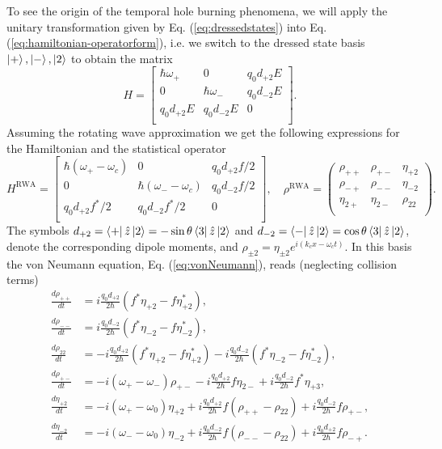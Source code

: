 \documentclass[]{spie}  %
\begin{document}
To see the origin of the temporal hole burning phenomena, we will apply the unitary transformation given by Eq. (\ref{eq:dressedstates}) into Eq. (\ref{eq:hamiltonian-operatorform}), i.e. we switch to the dressed state basis $\ket{+},\ket{-},\ket{2}$ to obtain the matrix
\begin{equation}
H = \begin{bmatrix}
\hbar \omega_+ & 0 & q_0d_{+2}E \\
0 & \hbar \omega_- & q_0d_{-2}E \\
q_0d_{+2}E & q_0d_{-2}E & 0 \\
\end{bmatrix}.
\end{equation}
Assuming the rotating wave approximation we get the following expressions for the Hamiltonian and the statistical operator
\begin{equation}
H^{\text{RWA}} = \begin{bmatrix}
\hbar (\omega_+-\omega_c) & 0 & q_0d_{+2}f/2 \\
0 & \hbar (\omega_--\omega_c) & q_0d_{-2}f/2 \\
q_0d_{+2}f^*/2 & q_0d_{-2}f^*/2 & 0 \\
\end{bmatrix},\quad \rho^{\text{RWA}} = \begin{pmatrix}
\rho_{++} & \rho_{+-} & \eta_{+2} \\ 
\rho_{-+} & \rho_{--} & \eta_{-2} \\ 
\eta_{2+} & \eta_{2-} & \rho_{22} \\ 
\end{pmatrix}.
\end{equation}
The symbols $d_{+2} = \Bra{+}\hat{z}\Ket{2} = -\sin\theta \Bra{3}\hat{z}\Ket{2}$ and $d_{-2} = \Bra{-}\hat{z}\Ket{2} = \cos\theta \Bra{3}\hat{z}\Ket{2}$, denote the corresponding dipole moments, and $\rho_{\pm 2} = \eta_{\pm 2} e^{i(k_cx-\omega_c t)}$. In this basis the von Neumann equation, Eq. (\ref{eq:vonNeumann}), reads (neglecting collision terms)
\begin{align}
\frac{d \rho_{++}}{dt} &= i\frac{q_0d_{+2}}{2\hbar}(f^*\eta_{+2}-f\eta_{+2}^*), \\
\frac{d \rho_{--}}{dt} &= i\frac{q_0d_{-2}}{2\hbar}(f^*\eta_{-2}-f\eta_{-2}^*), \\
\frac{d \rho_{22}}{dt} &= -i\frac{q_0d_{+2}}{2\hbar}(f^*\eta_{+2}-f\eta_{+2}^*)-i\frac{q_0d_{-2}}{2\hbar}(f^*\eta_{-2}-f\eta_{-2}^*), \\
\frac{d \rho_{+-}}{dt} &= -i(\omega_+-\omega_-)\rho_{+-}-i\frac{q_0d_{+2}}{2\hbar}f\eta_{2-}+i\frac{q_0d_{-2}}{2\hbar}f^*\eta_{+3},\\
\frac{d \eta_{+2}}{dt} &= -i(\omega_+-\omega_0)\eta_{+2}+i\frac{q_0d_{+2}}{2\hbar}f(\rho_{++}-\rho_{22})+i\frac{q_0d_{-2}}{2\hbar}f\rho_{+-},\\
\frac{d \eta_{-2}}{dt} &= -i(\omega_--\omega_0)\eta_{-2}+i\frac{q_0d_{-2}}{2\hbar}f(\rho_{--}-\rho_{22})+i\frac{q_0d_{+2}}{2\hbar}f\rho_{-+}.
\end{align}
\end{document}
